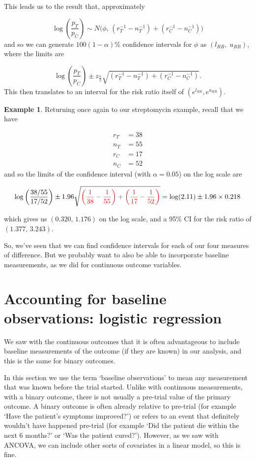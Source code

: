 \documentclass[
  openany]{book}
\theoremstyle{definition}
\theoremstyle{definition}
\newtheorem{example}{Example}[chapter]
\theoremstyle{definition}
\theoremstyle{definition}
\theoremstyle{remark}
\begin{document}
This leads us to the result that, approximately

\[\log\left(\frac{p_T}{p_C}\right) \sim N\bigg(\phi,\,\left(r_T^{-1} - n_T^{-1}\right) + \left(r_C^{-1} - n_C^{-1}\right) \bigg) \] and so we can generate \(100\left(1-\alpha\right)\)\% confidence intervals for \(\phi\) as \(\left(l_{RR},\;u_{RR}\right)\), where the limits are

\[
\log\left(\frac{p_T}{p_C}\right) \pm z_{\frac{\alpha}{2}}\sqrt{\left(r_T^{-1} - n_T^{-1}\right) + \left(r_C^{-1} - n_C^{-1}\right)}.
\]
This then translates to an interval for the risk ratio itself of \(\left(e^{l_{RR}},e^{u_{RR}}\right)\).

\begin{example}
Returning once again to our streptomycin example, recall that we have

\[
\begin{aligned}
r_T & = 38\\
n_T & = 55 \\
r_C & = 17 \\
n_C & = 52
\end{aligned}
\]
and so the limits of the confidence interval (with \(\alpha=0.05\)) on the log scale are

\[\log\left(\frac{38/55}{17/52}\right) \pm 1.96\sqrt{\color{red}{\left(\frac{1}{38} - \frac{1}{55}\right) + \left(\frac{1}{17} - \frac{1}{52}\right)}} = \log(2.11) \pm 1.96 \times 0.218\]

which gives us \(\left(0.320,\,1.176\right)\) on the log scale, and a 95\% CI for the risk ratio of \(\left(1.377,\,3.243\right)\).
\end{example}

So, we've seen that we can find confidence intervals for each of our four measures of difference. But we probably want to also be able to incorporate baseline measurements, as we
did for continuous outcome variables.

\hypertarget{logreg}{%
\section{Accounting for baseline observations: logistic regression}\label{logreg}}

We saw with the continuous outcomes that it is often advantageous to include baseline measurements of the outcome (if they are known) in our analysis, and this is the same for binary outcomes.

In this section we use the term `baseline observations' to mean any measurement that was known before the trial started. Unlike with continuous measurements, with a binary outcome, there is not usually a pre-trial value of the primary outcome. A binary outcome is often already relative to pre-trial (for example `Have the patient's symptoms improved?') or refers to an event that definitely wouldn't have happened pre-trial (for example `Did the patient die within the next 6 months?' or `Was the patient cured?'). However, as we saw with ANCOVA, we can include other sorts of covariates in a linear model, so this is fine.
\end{document}
